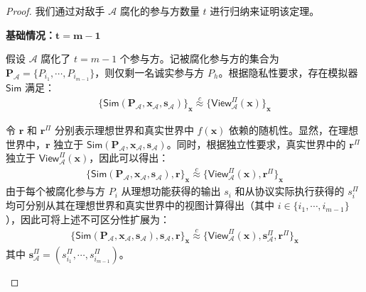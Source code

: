 \begin{proof}
我们通过对敌手 $\mathcal{A}$ 腐化的参与方数量 $t$ 进行归纳来证明该定理。

\begin{trivlist}
\item[$-$] \textbf{基础情况：$\mathbf{t = m-1}$}

假设 $\mathcal{A}$ 腐化了 $t = m-1$ 个参与方。记被腐化参与方的集合为 $\textbf{P}_{\mathcal{A}} = \{P_{i_1}, \cdots, P_{i_{m-1}}\}$，则仅剩一名诚实参与方 $P_h$。根据隐私性要求，存在模拟器 $\mathsf{Sim}$ 满足：
\begin{gather*}
    \{\mathsf{Sim}(\textbf{P}_{\mathcal{A}},\textbf{x}_{\mathcal{A}},\textbf{s}_{\mathcal{A}})\}_{\textbf{x}} \overset{c}{\approx} \{\mathsf{View}_{\mathcal{A}}^\Pi(\textbf{x})\}_{\textbf{x}}
\end{gather*}

令 $\textbf{r}$ 和 $\textbf{r}^\Pi$ 分别表示理想世界和真实世界中 $f(\textbf{x})$ 依赖的随机性。显然，在理想世界中，$\textbf{r}$ 独立于 $\mathsf{Sim}(\textbf{P}_{\mathcal{A}},\textbf{x}_{\mathcal{A}},\textbf{s}_{\mathcal{A}})$。同时，根据独立性要求，真实世界中的 $\textbf{r}^\Pi$ 独立于 $\mathsf{View}_{\mathcal{A}}^\Pi(\textbf{x})$，因此可以得出：
\begin{gather*}
    \{\mathsf{Sim}(\textbf{P}_{\mathcal{A}},\textbf{x}_{\mathcal{A}},\textbf{s}_{\mathcal{A}}),\textbf{r}\}_{\textbf{x}} \overset{c}{\approx} \{\mathsf{View}_{\mathcal{A}}^\Pi(\textbf{x}),\textbf{r}^\Pi\}_{\textbf{x}}
\end{gather*}
由于每个被腐化参与方 $P_i$ 从理想功能获得的输出 $s_{i}$ 和从协议实际执行获得的 $s^\Pi_{i}$均可分别从其在理想世界和真实世界中的视图计算得出（其中 $i \in \{i_1,\cdots,i_{m-1}\}$），因此可将上述不可区分性扩展为：
\begin{gather*}
    \{\mathsf{Sim}(\textbf{P}_{\mathcal{A}},\textbf{x}_{\mathcal{A}},\textbf{s}_{\mathcal{A}}),\textbf{s}_{\mathcal{A}}, \textbf{r}\}_{\textbf{x}} \overset{c}{\approx} \{\mathsf{View}_{\mathcal{A}}^\Pi(\textbf{x}),\textbf{s}^\Pi_{\mathcal{A}}, \textbf{r}^\Pi\}_{\textbf{x}}
\end{gather*}
其中 $\textbf{s}^\Pi_{\mathcal{A}} = (s^\Pi_{i_1}, \cdots, s^\Pi_{i_{m-1}})$。


\end{trivlist}
\end{proof}

